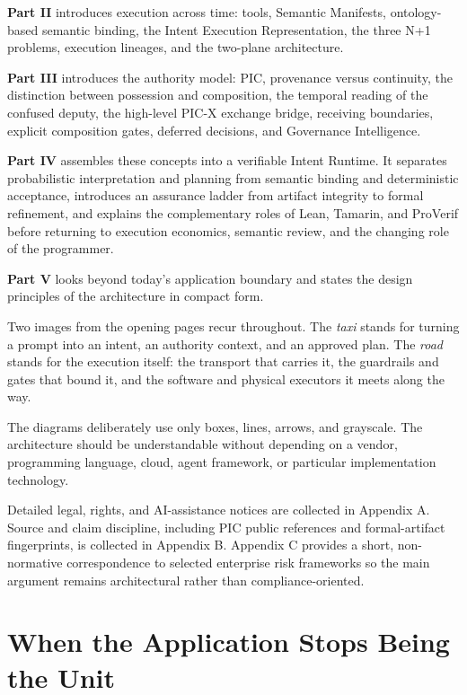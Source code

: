 \documentclass[10pt,oneside,openany]{book}
\makeatletter
\renewcommand\mainmatter{\clearpage\@mainmattertrue}
\makeatother
\begin{document}
\textbf{Part II} introduces execution across time: tools, Semantic Manifests, ontology-based semantic binding, the Intent Execution Representation, the three N+1 problems, execution lineages, and the two-plane architecture.

\textbf{Part III} introduces the authority model: PIC, provenance versus continuity, the distinction between possession and composition, the temporal reading of the confused deputy, the high-level PIC-X exchange bridge, receiving boundaries, explicit composition gates, deferred decisions, and Governance Intelligence.

\textbf{Part IV} assembles these concepts into a verifiable Intent Runtime. It separates probabilistic interpretation and planning from semantic binding and deterministic acceptance, introduces an assurance ladder from artifact integrity to formal refinement, and explains the complementary roles of Lean, Tamarin, and ProVerif before returning to execution economics, semantic review, and the changing role of the programmer.

\textbf{Part V} looks beyond today's application boundary and states the design principles of the architecture in compact form.

Two images from the opening pages recur throughout. The \emph{taxi} stands for turning a prompt into an intent, an authority context, and an approved plan. The \emph{road} stands for the execution itself: the transport that carries it, the guardrails and gates that bound it, and the software and physical executors it meets along the way.

The diagrams deliberately use only boxes, lines, arrows, and grayscale. The architecture should be understandable without depending on a vendor, programming language, cloud, agent framework, or particular implementation technology.

Detailed legal, rights, and AI-assistance notices are collected in Appendix A. Source and claim discipline, including PIC public references and formal-artifact fingerprints, is collected in Appendix B. Appendix C provides a short, non-normative correspondence to selected enterprise risk frameworks so the main argument remains architectural rather than compliance-oriented.

\mainmatter
\part{When the Application Stops Being the Unit}
\end{document}
